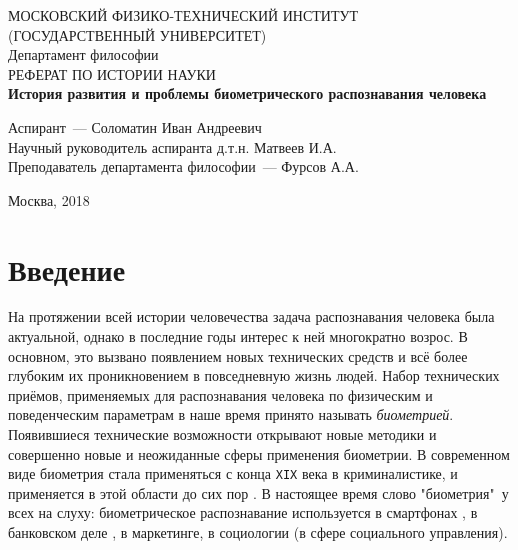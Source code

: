 \documentclass[14pt, a4paper]{extarticle}
\begin{document}
	\begin{titlepage}
		\begin{center}
			\hfill \break
			МОСКОВСКИЙ ФИЗИКО-ТЕХНИЧЕСКИЙ ИНСТИТУТ\\ (ГОСУДАРСТВЕННЫЙ УНИВЕРСИТЕТ)\\
			\hfill \break
			\hfill \break
			\hfill \break
			\hfill \break
			\hfill \break
			Департамент философии\\
			\hfill \break
			\hfill \break
			РЕФЕРАТ ПО ИСТОРИИ НАУКИ\\
			\hfill \break
			\hfill \break
			\large{\textbf{История развития и проблемы биометрического распознавания человека}}\\
			\hfill \break		
		\end{center}
		
		\begin{center}
			\hfill \break
			\parbox{0.9\textwidth}
			{
				Аспирант~--- Соломатин Иван Андреевич \\
				Научный руководитель аспиранта \underline{\hspace{3cm}} д.т.н. Матвеев И.А. \\
				Преподаватель департамента философии~--- Фурсов А.А. \\
			}
		\end{center}
		\hfill \break
		\hfill \break
		\hfill \break
		\hfill \break
		\begin{center} Москва, 2018 
		\end{center}
		\thispagestyle{empty} 
	\end{titlepage}
	
\tableofcontents
\newpage

\section{Введение}
На протяжении всей истории человечества задача распознавания человека была актуальной, однако в последние годы интерес к ней многократно возрос. В основном, это вызвано появлением новых технических средств и всё более глубоким их проникновением в повседневную жизнь людей. Набор технических приёмов, применяемых для распознавания человека по физическим и поведенческим параметрам в наше время принято называть \textit{биометрией}. Появившиеся технические возможности открывают новые методики и совершенно новые и неожиданные сферы применения биометрии. В современном виде биометрия стала применяться с конца \texttt{XIX} века в криминалистике, и применяется в этой области до сих пор \cite{tistarelli2014biometrics, bouchrika2011using}. В настоящее время слово "биометрия"\ у всех на слуху: биометрическое распознавание используется в смартфонах \cite{odinokikh2018high, sezan2014user, hwang2009keystroke}, в банковском деле \cite{fatima2011banking, venkatraman2008biometrics}, в маркетинге, в социологии (в сфере социального управления).
\end{document}
